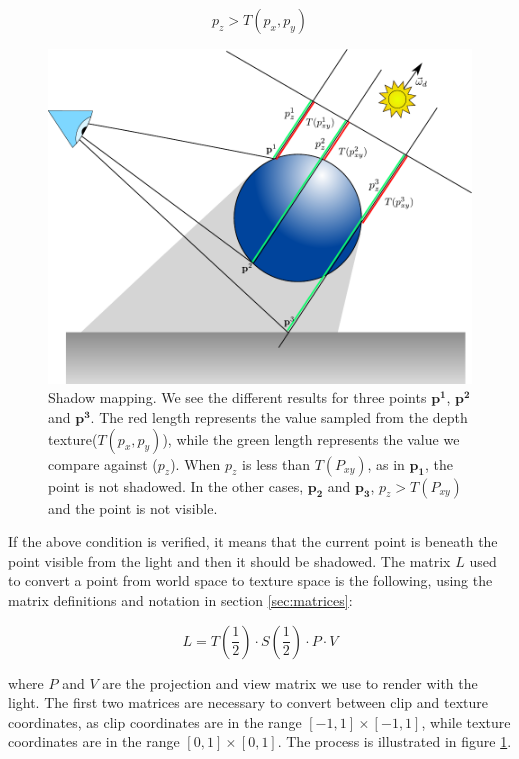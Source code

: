 $$
p_z > T(p_x,p_y)
\label{eq:shadowtest}
$$ 

\begin{figure}[!ht]
\centering
\includegraphics[width=\linewidth]{images/method/shadow_map.pdf}
\caption{Shadow mapping. We see the different results for three points $\mathbf{p^1}$, $\mathbf{p^2}$ and $\mathbf{p^3}$. The red length represents the value sampled from the depth texture($T(p_x,p_y)$), while the green length represents the value we compare against ($p_z$). When $p_z$ is less than $T(P_{xy})$, as in $\mathbf{p_1}$, the point is not shadowed. In the other cases, $\mathbf{p_2}$ and $\mathbf{p_3}$, $p_z > T(P_{xy})$and the point is not visible.}
\label{fig:shadow_map}
\end{figure} 

If the above condition is verified, it means that the current point is beneath the point visible from the light and then it should be shadowed. The matrix $L$ used to convert a point from world space to texture space is the following, using the matrix definitions and notation in section \ref{sec:matrices}:

$$
L = T\left(\frac{1}{2}\right) \cdot S\left(\frac{1}{2}\right) \cdot P \cdot V
$$

where $P$ and $V$ are the projection and view matrix we use to render with the light. The first two matrices are necessary to convert between clip and texture coordinates, as clip coordinates are in the range $[-1,1] \times [-1,1]$, while texture coordinates are in the range $[0,1]\times[0,1]$. The process is illustrated in figure \ref{fig:shadow_map}.


